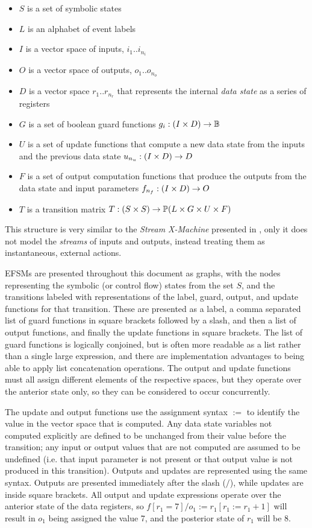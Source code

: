 \begin{itemize}
\item{$S$ is a set of symbolic states}
\item{$L$ is an alphabet of event labels}
\item{$I$ is a vector space of inputs, $i_{1} .. i_{n_i}$}
\item{$O$ is a vector space of outputs, $o_{1} .. o_{n_o}$}
\item{$D$ is a vector space $r_{1} .. r_{n_r}$ that represents the internal \emph{data state} as a series of registers}
\item{$G$ is a set of boolean guard functions $g_{i} : (I \times D) \rightarrow {\mathbb B}$}
\item{$U$ is a set of update functions that compute a new data state from the inputs and the previous data state $u_{n_u} : (I \times D) \rightarrow D$}
\item{$F$ is a set of output computation functions that produce the outputs from the data state and input parameters $f_{n_f} : (I \times D) \rightarrow O$}
\item{$T$ is a transition matrix $T : (S \times S) \rightarrow \mathbb P (L \times G \times U \times F)$}
\end{itemize}

This structure is very similar to the \emph{Stream X-Machine} presented in \cite{StreamXMachines}, only it does not model the \emph{streams} of inputs and outputs, instead treating them as instantaneous, external actions.

EFSMs are presented throughout this document as graphs, with the nodes representing the symbolic (or control flow) states from the set $S$, and the transitions labeled with representations of the label, guard, output, and update functions for that transition. These are presented as a label, a comma separated list of guard functions in square brackets followed by a slash, and then a list of output functions, and finally the update functions in square brackets. The list of guard functions is logically conjoined, but is often more readable as a list rather than a single large expression, and there are implementation advantages to being able to apply list concatenation operations. The output and update functions must all assign different elements of the respective spaces, but they operate over the anterior state only, so they can be considered to occur concurrently.

The update and output functions use the assignment syntax $:=$ to identify the value in the vector space that is computed. Any data state variables not computed explicitly are defined to be unchanged from their value before the transition; any input or output values that are not computed are assumed to be undefined (i.e. that input parameter is not present or that output value is not produced in this transition). Outputs and updates are represented using the same syntax. Outputs are presented immediately after the slash ($/$), while updates are inside square brackets. All output and update expressions operate over the anterior state of the data registers, so $f[r_1 = 7]/o_1 := r_1 [r_1 := r_1 + 1]$ will result in $o_1$ being assigned the value 7, and the posterior state of $r_1$ will be 8.

